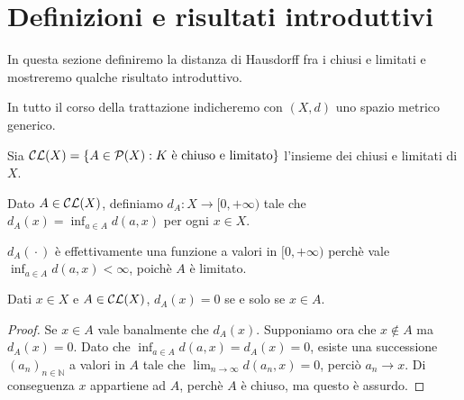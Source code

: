 \section{Definizioni e risultati introduttivi}
In questa sezione definiremo la distanza di Hausdorff fra i chiusi e limitati e mostreremo qualche risultato introduttivo.

In tutto il corso della trattazione indicheremo con $(X,d)$ uno spazio metrico generico.

\begin{definition}
	Sia $\mathcal{CL}(X)=\{A \in \mathcal{P}(X) : K \text{ è chiuso e limitato}\}$ l'insieme dei chiusi e limitati di $X$.
\end{definition}

\begin{definition}
	Dato $A\in \mathcal{CL}(X)$, definiamo $d_A: X\to [0,+\infty)$ tale che $d_A(x)=\inf_{a\in A}d(a,x)$ per ogni $x\in X$.
\end{definition}

\begin{remark}
	$d_A({}\cdot{})$ è effettivamente una funzione a valori in $[0,+\infty)$ perchè vale $\inf_{a\in A}d(a,x)<\infty$, poichè $A$ è limitato.
\end{remark}


\begin{lemma}\label{DistanzaChiusoAppartenenza}
	Dati $x\in X$ e $A \in \mathcal{CL}(X)$, $d_A(x)=0$ se e solo se $x\in A$.
\end{lemma}
\begin{proof}
	Se $x\in A$ vale banalmente che $d_A(x)$. Supponiamo ora che $x\not\in A$ ma $d_A(x)=0$. Dato che $\inf_{a\in A}d(a,x)=d_A(x)=0$, esiste una successione $(a_n)_{n\in\mathbb{N}}$ a valori in $A$ tale che $\lim_{n\to\infty}d(a_n,x)=0$, perciò $a_n\to x$. Di conseguenza $x$ appartiene ad $A$, perchè $A$ è chiuso, ma questo è assurdo. 
\end{proof}



